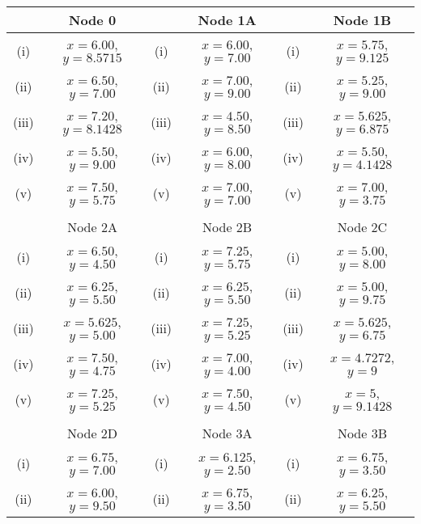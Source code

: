 \documentclass[a4paper,12pt]{article}
\begin{document}
	\normalsize	
	\begin{tabular}{||c|c||c|c||c|c||}
		\hline  & Node 0 &   & Node 1A &  & Node 1B     \\  \hline
		\hline (i) & $x= 6.00$, $y= 8.5715$ & (i) & $x= 6.00$, $y= 7.00$ &  (i)  & $x= 5.75$, $y = 9.125$\\  \hline
		\hline (ii)  & $x= 6.50$, $y= 7.00$  &  (ii) & $x= 7.00$, $y= 9.00$ & (ii) & $x= 5.25$, $y = 9.00 $ \\  \hline
		\hline (iii) & $x= 7.20$, $y = 8.1428$  & (iii) & $x= 4.50$, $y = 8.50$ & (iii) & $x= 5.625$, $y = 6.875$ \\  \hline
		\hline (iv)  & $x= 5.50$, $y =9.00 $  &  (iv) & $x= 6.00$, $y = 8.00 $ & (iv)  & $x= 5.50$, $y= 4.1428$\\  \hline
		\hline (v) & $x= 7.50$, $y= 5.75$ & (v)  & $x= 7.00$, $y= 7.00$ & (v) & $x= 7.00$, $y= 3.75$\\  \hline & & & & & \\
		\hline 
		\hline  & Node 2A &   & Node 2B &  & Node 2C  \\  \hline
		\hline (i) & $x= 6.50$, $y= 4.50$ & (i)  & $x= 7.25 $, $y = 5.75 $  & (i)  & $x= 5.00$, $y = 8.00$\\  \hline
		\hline (ii)  & $x= 6.25$, $y= 5.50$  &  (ii) &$x= 6.25$, $y= 5.50$ & (ii) & $x= 5.00$, $y = 9.75 $ \\  \hline
		\hline (iii) & $x= 5.625  $, $y = 5.00 $  &  (iii) &$x= 7.25 $, $y = 5.25 $ &  (iii) & $x= 5.625$, $y = 6.75$ \\  \hline
		\hline (iv)  & $x= 7.50$, $y = 4.75 $  & (iv) & $x= 7.00 $, $y = 4.00 $ & (iv)  & $x= 4.7272$, $y = 9$\\  \hline
		\hline (v) & $x= 7.25 $, $y = 5.25 $ & (v) & $x= 7.50$, $y= 4.50$  &(v) & $x= 5$, $y= 9.1428$\\  \hline & & & & & \\
		\hline 
		\hline  & Node 2D &   & Node 3A &  & Node 3B   \\  \hline
		\hline (i) & $x= 6.75$, $y= 7.00$ &  (i) & $x= 6.125$, $y= 2.50$  & (i)  & $x= 6.75$, $y= 3.50$\\  \hline
		\hline (ii)  & $x= 6.00$, $y = 9.50$  &  (ii) & $x= 6.75$, $y= 3.50$ & (ii) & $x= 6.25$, $y= 5.50$ \\  \hline

\end{tabular}
\end{document}
